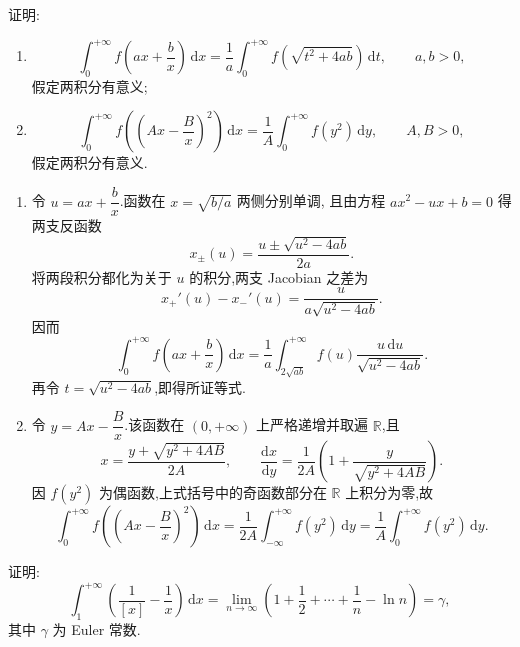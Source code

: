 \begin{example}
  证明:
  \begin{enumerate}
    \item
          \[
            \displaystyle\int_0^{+\infty}f\left(ax+\dfrac{b}{x}\right)\,\mathrm{d}x
            =\dfrac{1}{a}\int_0^{+\infty}f\left(\sqrt{t^2+4ab}\right)\,\mathrm{d}t,
            \qquad a,b>0,
          \]
          假定两积分有意义;
    \item
          \[
            \displaystyle\int_0^{+\infty}f\left(\left(Ax-\dfrac{B}{x}\right)^2\right)\,\mathrm{d}x
            =\dfrac{1}{A}\int_0^{+\infty}f(y^2)\,\mathrm{d}y,
            \qquad A,B>0,
          \]
          假定两积分有意义.
  \end{enumerate}
\end{example}
\exampleblank

\begin{solution}
  \leavevmode
  \begin{enumerate}
    \item 令 $u=ax+\dfrac{b}{x}$.函数在 $x=\sqrt{b/a}$ 两侧分别单调,
          且由方程 $ax^2-ux+b=0$ 得两支反函数
          \[
            x_\pm(u)=\dfrac{u\pm\sqrt{u^2-4ab}}{2a}.
          \]
          将两段积分都化为关于 $u$ 的积分,两支 Jacobian 之差为
          \[
            x_+'(u)-x_-'(u)=\dfrac{u}{a\sqrt{u^2-4ab}}.
          \]
          因而
          \[
            \displaystyle\int_0^{+\infty}f\left(ax+\dfrac{b}{x}\right)\,\mathrm{d}x
            =\dfrac{1}{a}\int_{2\sqrt{ab}}^{+\infty}
            f(u)\dfrac{u\,\mathrm{d}u}{\sqrt{u^2-4ab}}.
          \]
          再令 $t=\sqrt{u^2-4ab}$,即得所证等式.

    \item 令 $y=Ax-\dfrac{B}{x}$.该函数在 $(0,+\infty)$ 上严格递增并取遍
          $\mathbb{R}$,且
          \[
            x=\dfrac{y+\sqrt{y^2+4AB}}{2A},
            \qquad
            \dfrac{\mathrm{d}x}{\mathrm{d}y}
            =\dfrac{1}{2A}\left(1+\dfrac{y}{\sqrt{y^2+4AB}}\right).
          \]
          因 $f(y^2)$ 为偶函数,上式括号中的奇函数部分在 $\mathbb{R}$ 上积分为零,故
          \[
            \displaystyle\int_0^{+\infty}f\left(\left(Ax-\dfrac{B}{x}\right)^2\right)\,\mathrm{d}x
            =\dfrac{1}{2A}\int_{-\infty}^{+\infty}f(y^2)\,\mathrm{d}y
            =\dfrac{1}{A}\int_0^{+\infty}f(y^2)\,\mathrm{d}y.
          \]
  \end{enumerate}
\end{solution}

\begin{example}[\markstar]
  证明:
  \[
    \displaystyle\int_1^{+\infty}\left(\dfrac{1}{[x]}-\dfrac{1}{x}\right)\,\mathrm{d}x
    =\lim\limits_{n\to\infty}\left(1+\dfrac{1}{2}+\cdots+\dfrac{1}{n}-\ln n\right)
    =\gamma,
  \]
  其中 $\gamma$ 为 Euler 常数.
\end{example}
\exampleblank

